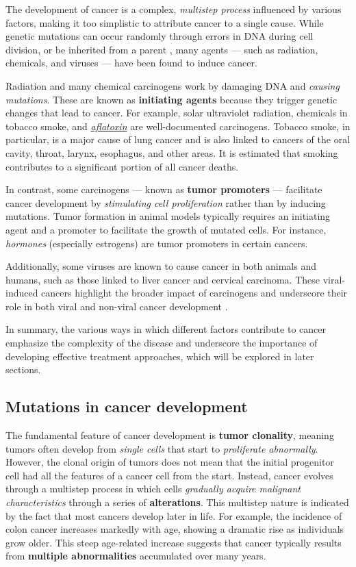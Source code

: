 The development of cancer is a complex, \textit{multistep process} influenced by various factors, making it too simplistic to attribute cancer to a single cause. While genetic mutations can occur randomly through errors in DNA during cell division, or be inherited from a parent \cite{cancer2}, many agents --- such as radiation, chemicals, and viruses --- have been found to induce cancer.

Radiation and many chemical carcinogens work by damaging DNA and \textit{causing mutations}. These are known as \textbf{initiating agents} because they trigger genetic changes that lead to cancer. For example, solar ultraviolet radiation, chemicals in tobacco smoke, and \href{https://en.wikipedia.org/wiki/Aflatoxin}{\textit{aflatoxin}} are well-documented carcinogens. Tobacco smoke, in particular, is a major cause of lung cancer and is also linked to cancers of the oral cavity, throat, larynx, esophagus, and other areas. It is estimated that smoking contributes to a significant portion of all cancer deaths.

In contrast, some carcinogens --- known as \textbf{tumor promoters} --- facilitate cancer development by \textit{stimulating cell proliferation} rather than by inducing mutations. Tumor formation in animal models typically requires an initiating agent and a promoter to facilitate the growth of mutated cells. For instance, \textit{hormones} (especially estrogens) are tumor promoters in certain cancers.

Additionally, some viruses are known to cause cancer in both animals and humans, such as those linked to liver cancer and cervical carcinoma. These viral-induced cancers highlight the broader impact of carcinogens and underscore their role in both viral and non-viral cancer development \cite{nih_cancer_dev}.

In summary, the various ways in which different factors contribute to cancer emphasize the complexity of the disease and underscore the importance of developing effective treatment approaches, which will be explored in later sections.

\subsection{Mutations in cancer development}

The fundamental feature of cancer development is \textbf{tumor clonality}, meaning tumors often develop from \textit{single cells} that start to \textit{proliferate abnormally}. However, the clonal origin of tumors does not mean that the initial progenitor cell had all the features of a cancer cell from the start. Instead, cancer evolves through a multistep process in which cells \textit{gradually acquire malignant characteristics} through a series of \textbf{alterations}. This multistep nature is indicated by the fact that most cancers develop later in life. For example, the incidence of colon cancer increases markedly with age, showing a dramatic rise as individuals grow older. This steep age-related increase suggests that cancer typically results from \textbf{multiple abnormalities} accumulated over many years.

